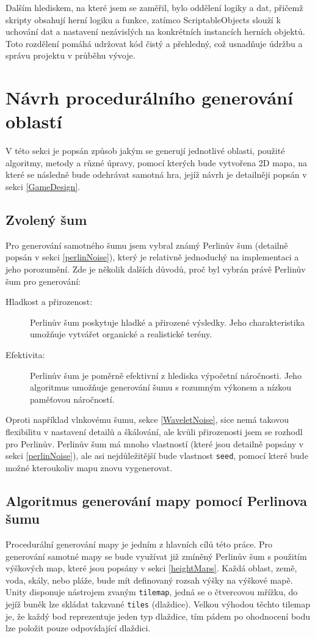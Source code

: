 Dalším hlediskem, na které jsem se zaměřil, bylo oddělení logiky a dat, přičemž skripty obsahují herní logiku a funkce, zatímco ScriptableObjects slouží k uchování dat a nastavení nezávislých na konkrétních instancích herních objektů. Toto rozdělení pomáhá udržovat kód čistý a přehledný, což usnadňuje údržbu a správu projektu v průběhu vývoje.

\section{Návrh procedurálního generování oblastí}
V této sekci je popsán způsob jakým se generují jednotlivé oblasti, použité algoritmy, metody a různé úpravy, pomocí kterých bude vytvořena 2D mapa, na které se následně bude odehrávat samotná hra, jejíž návrh je detailněji popsán v sekci \ref{GameDesign}.

\subsection{Zvolený šum}
Pro generování samotného šumu jsem vybral známý Perlinův šum (detailně popsán v sekci \ref{perlinNoise}), který je relativně jednoduchý na implementaci a jeho porozumění. Zde je několik dalších důvodů, proč byl vybrán právě Perlinův šum pro generování:

\begin{description}
	\item[Hladkost a přirozenost:] Perlinův šum poskytuje hladké a přirozené výsledky. Jeho charakteristika umožňuje vytvářet organické a realistické terény.
	\item[Efektivita:] Perlinův šum je poměrně efektivní z hlediska výpočetní náročnosti. Jeho algoritmus umožňuje generování šumu s rozumným výkonem a nízkou paměťovou náročností.
\end{description}

Oproti například vlnkovému šumu, sekce \ref{WaveletNoise}, sice nemá takovou flexibilitu v nastavení detailů a škálování, ale kvůli přirozenosti jsem se rozhodl pro Perlinův. Perlinův šum má mnoho vlastností (které jsou detailně popsány v sekci \ref{perlinNoise}), ale asi nejdůležitější bude vlastnost \texttt{seed}, pomocí které bude možné kteroukoliv mapu znovu vygenerovat.

\newpage
\subsection{Algoritmus generování mapy pomocí Perlinova šumu}
Procedurální generování mapy je jedním z hlavních cílů této práce. Pro generování samotné mapy se bude využívat již zmíněný Perlinův šum s použitím výškových map, které jsou popsány v sekci \ref{heightMaps}. Každá oblast, země, voda, skály, nebo pláže, bude mít definovaný rozsah výšky na výškové mapě. Unity disponuje nástrojem zvaným \texttt{tilemap}, jedná se o čtvercovou mřížku, do jejíž buněk lze skládat takzvané \texttt{tiles} (dlaždice). Velkou výhodou těchto tilemap je, že každý bod reprezentuje jeden typ dlaždice, tím pádem po ohodnocení bodu lze položit pouze odpovídající dlaždici.

